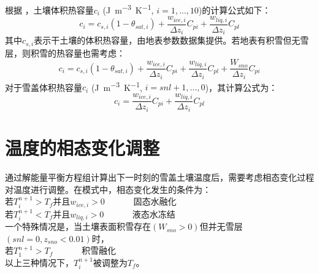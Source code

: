 根据 \citet{de1963thermal}，土壤体积热容量$c_i$ (\unit{J.m^{-3}.K^{-1}}, $i=1, \ldots, 10$)的计算公式如下：
\begin{equation}
c_{i}=c_{s, i}\left(1-\theta_{sat, i}\right)+\frac{w_{ice, i}}{\Delta z_{i}} C_{pi}+\frac{w_{liq, i}}{\Delta z_{i}} C_{p l}
\end{equation}
其中$c_{s,i}$表示干土壤的体积热容量，由地表参数数据集提供。若地表有积雪但无雪层，则积雪的热容量也需考虑：
\begin{equation}
c_{i}=c_{s,i}\left(1-\theta_{sat, i}\right)+\frac{w_{ice, i}}{\Delta z_{i}} C_{pi}+\frac{w_{liq,i}}{\Delta z_{i}} C_{pl}+\frac{W_{sno}}{\Delta z_{i}} C_{pi}
\end{equation}
对于雪盖体积热容量$c_i$ (\unit{J.m^{-3}.K^{-1}}, $i=snl+1, \ldots, 0$)，其计算公式为：
\begin{equation}
c_{i}=\frac{w_{ice, i}}{\Delta z_{i}} C_{pi}+\frac{w_{liq, i}}{\Delta z_{i}} C_{pl}
\end{equation}


\section{温度的相态变化调整}
通过解能量平衡方程组计算出下一时刻的雪盖土壤温度后，需要考虑相态变化过程对温度进行调整。在模式中，相态变化发生的条件为：\\
若$T_i^{n+1}>T_f$并且$w_{ice,i}>0$ \ \   \ \  \ \   固态水融化\\
若$T_i^{n+1}<T_f$并且$w_{liq,i}>0$  \ \   \ \  \ \         液态水冻结\\
一个特殊情况是，当土壤表面积雪存在$\left(W_{sno}>0\right)$但并无雪层$\left(snl=0,z_{sno}<0.01\right)$时，\\
若$T_1^{n+1}>T_f$      \ \   \ \  \ \                 积雪融化\\
以上三种情况下，$T_i^{n+1}$被调整为$T_f$。



